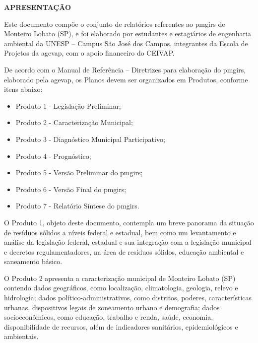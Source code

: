 \thispagestyle{headfootimage}

\begin{center}
    {\bfseries\Large\MakeUppercase{Apresentação}}
    \vspace{1.5em}
\end{center}
Este documento compõe o conjunto de relatórios referentes ao \gls{pmgirs} de Monteiro Lobato (SP), e foi elaborado por estudantes e estagiários de engenharia ambiental da UNESP – Campus São José dos Campos, integrantes da Escola de Projetos da \gls{agevap}, com o apoio financeiro do CEIVAP.\vspace{1.5em}

De acordo com o Manual de Referência – Diretrizes para elaboração do \gls{pmgirs}, elaborado pela \gls{agevap}, os Planos devem ser organizados em Produtos, conforme itens abaixo:

\begin{itemize}
    \item {Produto 1 - Legislação Preliminar;}
    \item {Produto 2 - Caracterização Municipal;}
    \item {Produto 3 - Diagnóstico Municipal Participativo;}
    \item Produto 4 - Prognóstico;
    \item Produto 5 - Versão Preliminar do \gls{pmgirs};
    \item Produto 6 - Versão Final do \gls{pmgirs};
    \item Produto 7 - Relatório Síntese do \gls{pmgirs}.
\end{itemize}



O Produto 1, objeto deste documento, contempla um breve panorama da situação de resíduos sólidos a níveis federal e estadual, bem como um levantamento e análise da legislação federal, estadual e sua integração com a legislação municipal e decretos regulamentadores, na área de resíduos sólidos, educação ambiental e saneamento básico.\vspace{1.5em}

O Produto 2 apresenta a caracterização municipal de Monteiro Lobato (SP) contendo dados geográficos, como localização, climatologia, geologia, relevo e hidrologia; dados político-administrativos, como distritos, poderes, características urbanas, dispositivos legais de zoneamento urbano e demografia; dados socioeconômicos, como educação, trabalho e renda, saúde, economia, disponibilidade de recursos, além de indicadores sanitários, epidemiológicos e ambientais.\vspace{1.5em}


